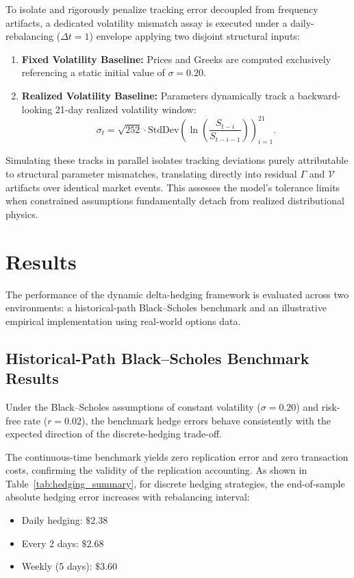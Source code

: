 \documentclass{article}
\begin{document}
To isolate and rigorously penalize tracking error decoupled from frequency artifacts, a dedicated volatility mismatch assay is executed under a daily-rebalancing ($\Delta t = 1$) envelope applying two disjoint structural inputs:
\begin{enumerate}
    \item \textbf{Fixed Volatility Baseline:} Prices and Greeks are computed exclusively referencing a static initial value of $\sigma = 0.20$.
    \item \textbf{Realized Volatility Baseline:} Parameters dynamically track a backward-looking 21-day realized volatility window:
    \[
    \sigma_t = \sqrt{252} \cdot \text{StdDev} \left( \ln \left( \frac{S_{t-i}}{S_{t-i-1}} \right) \right)_{i=1}^{21}.
    \]
\end{enumerate}

Simulating these tracks in parallel isolates tracking deviations purely attributable to structural parameter mismatches, translating directly into residual $\Gamma$ and $\mathcal{V}$ artifacts over identical market events. This assesses the model's tolerance limits when constrained assumptions fundamentally detach from realized distributional physics.
\section{Results}


The performance of the dynamic delta-hedging framework is evaluated across two environments: a historical-path Black--Scholes benchmark and an illustrative empirical implementation using real-world options data.

\subsection{Historical-Path Black--Scholes Benchmark Results}

Under the Black--Scholes assumptions of constant volatility ($\sigma = 0.20$) and risk-free rate ($r = 0.02$), the benchmark hedge errors behave consistently with the expected direction of the discrete-hedging trade-off.

The continuous-time benchmark yields zero replication error and zero transaction costs, confirming the validity of the replication accounting. As shown in Table~\ref{tab:hedging_summary}, for discrete hedging strategies, the end-of-sample absolute hedging error increases with rebalancing interval:
\begin{itemize}
    \item Daily hedging: $\$2.38$
    \item Every 2 days: $\$2.68$
    \item Weekly (5 days): $\$3.60$
\end{itemize}
\end{document}

